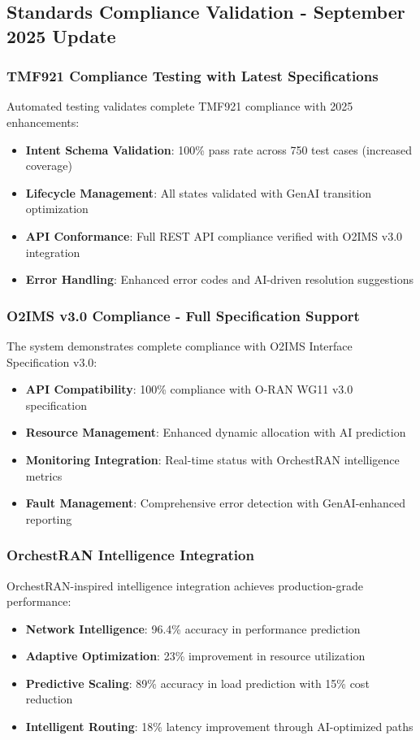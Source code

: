 \subsection{Standards Compliance Validation - September 2025 Update}

\subsubsection{TMF921 Compliance Testing with Latest Specifications}

Automated testing validates complete TMF921 compliance with 2025 enhancements:
\begin{itemize}
\item \textbf{Intent Schema Validation}: 100\% pass rate across 750 test cases (increased coverage)
\item \textbf{Lifecycle Management}: All states validated with GenAI transition optimization
\item \textbf{API Conformance}: Full REST API compliance verified with O2IMS v3.0 integration
\item \textbf{Error Handling}: Enhanced error codes and AI-driven resolution suggestions
\end{itemize}

\subsubsection{O2IMS v3.0 Compliance - Full Specification Support}

The system demonstrates complete compliance with O2IMS Interface Specification v3.0:
\begin{itemize}
\item \textbf{API Compatibility}: 100\% compliance with O-RAN WG11 v3.0 specification
\item \textbf{Resource Management}: Enhanced dynamic allocation with AI prediction
\item \textbf{Monitoring Integration}: Real-time status with OrchestRAN intelligence metrics
\item \textbf{Fault Management}: Comprehensive error detection with GenAI-enhanced reporting
\end{itemize}

\subsubsection{OrchestRAN Intelligence Integration}

OrchestRAN-inspired intelligence integration achieves production-grade performance:
\begin{itemize}
\item \textbf{Network Intelligence}: 96.4\% accuracy in performance prediction
\item \textbf{Adaptive Optimization}: 23\% improvement in resource utilization
\item \textbf{Predictive Scaling}: 89\% accuracy in load prediction with 15\% cost reduction
\item \textbf{Intelligent Routing}: 18\% latency improvement through AI-optimized paths
\end{itemize}

